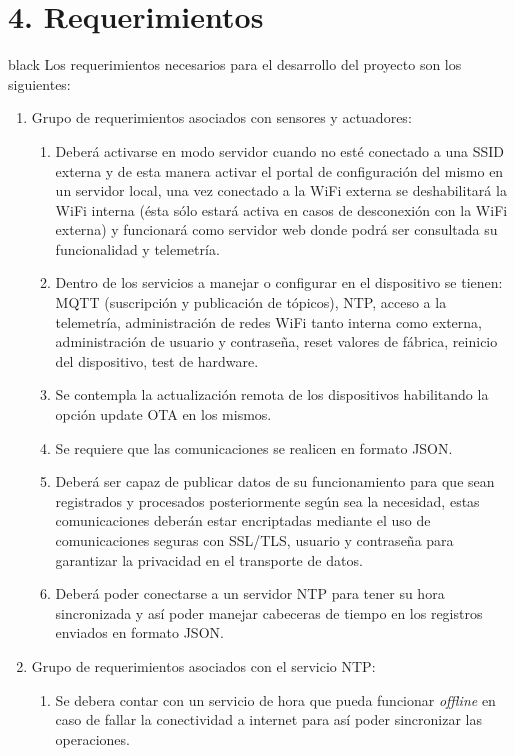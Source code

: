 \documentclass[11pt]{charter}
\begin{document}

\section{4. Requerimientos}
\label{sec:requerimientos}
\begin{consigna}{black}
Los requerimientos necesarios para el desarrollo del proyecto son los siguientes:
\begin{enumerate}
\item Grupo de requerimientos asociados con sensores y actuadores:
	\begin{enumerate}
		\item Deberá activarse en modo servidor cuando no esté conectado a una SSID externa y de esta manera activar el portal de configuración del mismo en un servidor local, una vez conectado a la WiFi externa se deshabilitará la WiFi interna (ésta sólo estará activa en casos de desconexión con la WiFi externa) y funcionará como servidor web donde podrá ser consultada su funcionalidad y telemetría.
		\item Dentro de los servicios a manejar o configurar en el dispositivo se tienen: MQTT (suscripción y publicación de tópicos), NTP, acceso a la telemetría, administración de redes WiFi tanto interna como externa, administración de usuario y contraseña, reset valores de fábrica, reinicio del dispositivo, test de hardware.
		\item Se contempla la actualización remota de los dispositivos habilitando la opción update OTA en los mismos.
		\item Se requiere que las comunicaciones se realicen en formato JSON.
		\item Deberá ser capaz de publicar datos de su funcionamiento para que sean registrados y procesados posteriormente según sea la necesidad, estas comunicaciones deberán estar encriptadas mediante el uso de comunicaciones seguras con SSL/TLS, usuario y contraseña para garantizar la privacidad en el transporte de datos.
		\item Deberá poder conectarse a un servidor NTP para tener su hora sincronizada y así poder manejar cabeceras de tiempo en los registros enviados en formato JSON.
	\end{enumerate}
\item Grupo de requerimientos asociados con el servicio NTP:
	\begin{enumerate}
		\item Se debera contar con un servicio de hora que pueda funcionar \emph{offline} en caso de fallar la conectividad a internet para así poder sincronizar las operaciones.

\end{enumerate}
\end{enumerate}
\end{consigna}
\end{document}
